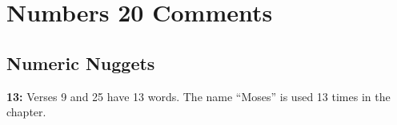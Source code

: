 \section{Numbers 20 Comments}

\subsection{Numeric Nuggets}
\textbf{13: } Verses 9 and 25 have 13 words. The name ``Moses'' is used 13 times in the chapter.